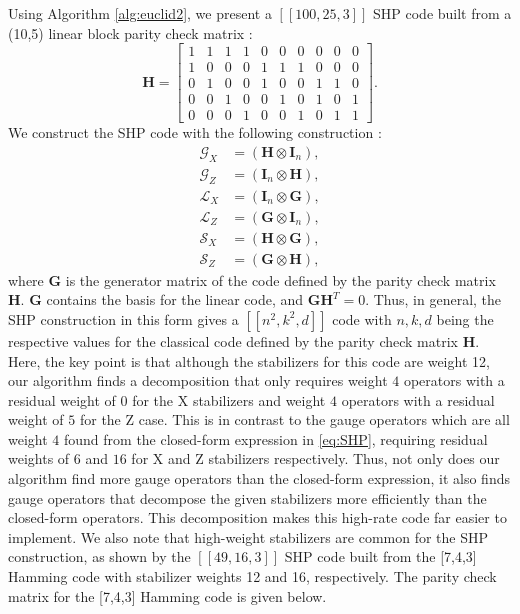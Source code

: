 \documentclass[conference]{IEEEtran}
\newcommand{\llbr}{[\![}
\newcommand{\rrbr}{]\!]}
\begin{document}
Using Algorithm \eqref{alg:euclid2}, we present a $\llbr 100,25,3 \rrbr$ SHP code built from a (10,5) linear block parity check matrix \cite{ryan2004introduction}: 
\begin{equation} \label{eq:H_binary} \boldsymbol{H}=
\begin{bmatrix}
    1&1&1&1&0&0&0&0&0&0 \\
    1&0&0&0&1&1&1&0&0&0 \\
    0&1&0&0&1&0&0&1&1&0 \\
    0&0&1&0&0&1&0&1&0&1\\
    0&0&0&1&0&0&1&0&1&1
\end{bmatrix}.
\end{equation}
We construct the SHP code with the following construction \cite{li2020numerical}:
\begin{align}
\label{eq:SHP}
\mathcal{G}_{X} &= \left(\boldsymbol{H}\otimes \boldsymbol{I}_{n}\right), \nonumber\\ 
\mathcal{G}_{Z} &= \left(\boldsymbol{I}_{n} \otimes \boldsymbol{H} \right), \nonumber\\ 
\mathcal{L}_{X} &= \left(\boldsymbol{I}_{n} \otimes \boldsymbol{G}\right),\\ 
\mathcal{L}_{Z} &= \left( \boldsymbol{G}\otimes \boldsymbol{I}_{n} \right), \nonumber\\ 
\mathcal{S}_{X} &= \left(\boldsymbol{H} \otimes \boldsymbol{G}\right), \nonumber\\ 
\mathcal{S}_{Z} &= \left( \boldsymbol{G}\otimes \boldsymbol{H}\right) \nonumber,
\end{align}
where $\boldsymbol{G}$ is the generator matrix of the code defined by the parity check matrix $\boldsymbol{H}$. $\boldsymbol{G}$ contains the basis for the linear code, and $\boldsymbol{G}\boldsymbol{H}^{T}=0$.
Thus, in general, the SHP construction in this form gives a $\llbr n^{2},k^{2},d \rrbr$ code with $n,k,d$ being the respective values for the classical code defined by the parity check matrix $\boldsymbol{H}$. Here, the key point is that although the stabilizers for this code are weight 12, our algorithm finds a decomposition that only requires weight $4$ operators with a residual weight of $0$ for the X stabilizers and weight $4$ operators with a residual weight of $5$ for the Z case. This is in contrast to the gauge operators which are all weight $4$ found from the closed-form expression in \eqref{eq:SHP}, requiring residual weights of $6$ and $16$ for X and Z stabilizers respectively. Thus, not only does our algorithm find more gauge operators than the closed-form expression, it also finds gauge operators that decompose the given stabilizers more efficiently than the closed-form operators. This decomposition makes this high-rate code far easier to implement. We also note that high-weight stabilizers are common for the SHP construction, as shown by the $ \llbr 49,16,3 \rrbr$ SHP code built from the [7,4,3] Hamming code with stabilizer weights 12 and 16, respectively. The parity check matrix for the [7,4,3] Hamming code is given below.  
\end{document}

